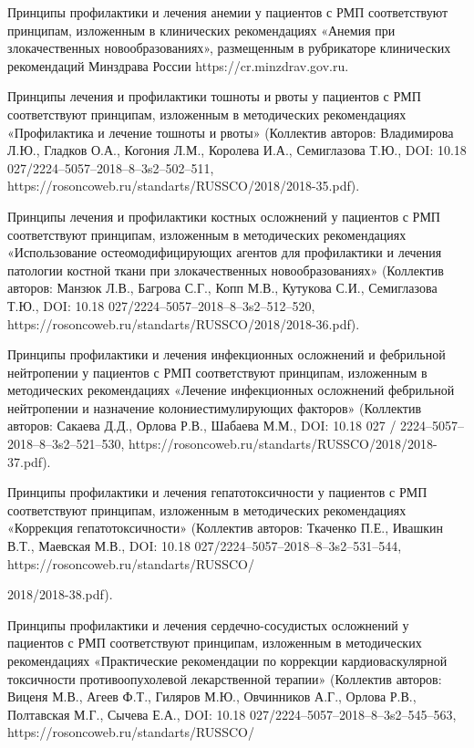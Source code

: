 Принципы профилактики и лечения анемии у пациентов с РМП соответствуют принципам, изложенным в клинических рекомендациях «Анемия при злокачественных новообразованиях», размещенным в рубрикаторе клинических рекомендаций Минздрава России https://cr.minzdrav.gov.ru.

Принципы лечения и профилактики тошноты и рвоты у пациентов с РМП соответствуют принципам, изложенным в методических рекомендациях «Профилактика и лечение тошноты и рвоты» (Коллектив авторов: Владимирова Л.Ю., Гладков О.А., Когония Л.М., Королева И.А., Семиглазова Т.Ю., DOI: 10.18 027/2224–5057–2018–8–3s2–502–511, https://rosoncoweb.ru/standarts/RUSSCO/2018/2018-35.pdf).

Принципы лечения и профилактики костных осложнений у пациентов с РМП соответствуют принципам, изложенным в методических рекомендациях «Использование остеомодифицирующих агентов для профилактики и лечения патологии костной ткани при злокачественных новообразованиях» (Коллектив авторов: Манзюк Л.В., Багрова С.Г., Копп М.В., Кутукова С.И., Семиглазова Т.Ю., DOI: 10.18 027/2224–5057–2018–8–3s2–512–520, https://rosoncoweb.ru/standarts/RUSSCO/2018/2018-36.pdf).

Принципы профилактики и лечения инфекционных осложнений и фебрильной нейтропении у пациентов с РМП соответствуют принципам, изложенным в методических рекомендациях «Лечение инфекционных осложнений фебрильной нейтропении и назначение колониестимулирующих факторов» (Коллектив авторов: Сакаева Д.Д., Орлова Р.В., Шабаева М.М., DOI: 10.18 027 / 2224–5057–2018–8–3s2–521–530, https://rosoncoweb.ru/standarts/RUSSCO/2018/2018-37.pdf).

Принципы профилактики и лечения гепатотоксичности у пациентов с РМП соответствуют принципам, изложенным в методических рекомендациях «Коррекция гепатотоксичности» (Коллектив авторов: Ткаченко П.Е., Ивашкин В.Т., Маевская М.В., DOI: 10.18 027/2224–5057–2018–8–3s2–531–544, https://rosoncoweb.ru/standarts/RUSSCO/

2018/2018-38.pdf).

Принципы профилактики и лечения сердечно-сосудистых осложнений у пациентов с РМП соответствуют принципам, изложенным в методических рекомендациях «Практические рекомендации по коррекции кардиоваскулярной токсичности противоопухолевой лекарственной терапии» (Коллектив авторов: Виценя М.В., Агеев Ф.Т., Гиляров М.Ю., Овчинников А.Г., Орлова Р.В., Полтавская М.Г., Сычева Е.А., DOI: 10.18 027/2224–5057–2018–8–3s2–545–563, https://rosoncoweb.ru/standarts/RUSSCO/

